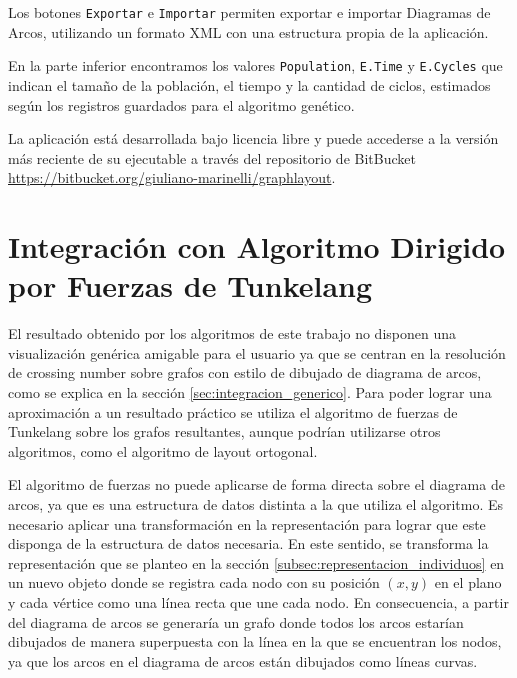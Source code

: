 Los botones \texttt{Exportar} e \texttt{Importar} permiten exportar e importar Diagramas de Arcos, utilizando un formato XML con una estructura propia de la aplicación.

En la parte inferior encontramos los valores \texttt{Population}, \texttt{E.Time} y \texttt{E.Cycles} que indican el tamaño de la población, el tiempo y la cantidad de ciclos, estimados según los registros guardados para el algoritmo genético.	


La aplicación está  desarrollada bajo licencia libre y puede accederse a la versión más reciente de su ejecutable a través del repositorio de BitBucket  \url{https://bitbucket.org/giuliano-marinelli/graphlayout}.

\section{Integración con Algoritmo Dirigido por Fuerzas de Tunkelang}
\label{sec:integracion_tunkelang}
El resultado obtenido por los algoritmos de este trabajo no disponen una visualización genérica amigable para el usuario ya que se centran en la resolución de crossing number sobre grafos con estilo de dibujado de diagrama de arcos, como se explica en la sección \ref{sec:integracion_generico}. Para poder lograr una aproximación a un resultado práctico se utiliza el algoritmo de fuerzas de Tunkelang sobre los grafos resultantes, aunque podrían utilizarse otros algoritmos, como el algoritmo de layout ortogonal. 

El algoritmo de fuerzas no puede aplicarse de forma directa sobre el diagrama de arcos, ya que es una estructura de datos distinta a la que utiliza el algoritmo. Es necesario aplicar una transformación en la representación para lograr que este disponga de la estructura de datos necesaria. En este sentido, se transforma la representación que se planteo en la sección \ref{subsec:representacion_individuos} en un nuevo objeto donde se registra cada nodo con su posición $(x,y)$ en el plano y cada vértice como una línea recta que une cada nodo. En consecuencia, a partir del diagrama de arcos se generaría un grafo donde todos los arcos estarían dibujados de manera superpuesta con la línea en la que se encuentran los nodos, ya que los arcos en el diagrama de arcos están dibujados como líneas curvas.

